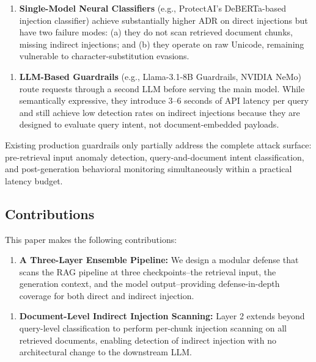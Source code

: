 \documentclass[conference]{IEEEtran}
\begin{document}
\begin{enumerate}
\item \textbf{Single-Model Neural Classifiers} (e.g., ProtectAI's DeBERTa-based injection classifier) achieve substantially higher ADR on direct injections but have two failure modes: (a) they do not scan retrieved document chunks, missing indirect injections; and (b) they operate on raw Unicode, remaining vulnerable to character-substitution evasions.
\end{enumerate}

\begin{enumerate}
\item \textbf{LLM-Based Guardrails} (e.g., Llama-3.1-8B Guardrails, NVIDIA NeMo) route requests through a second LLM before serving the main model. While semantically expressive, they introduce 3--6 seconds of API latency per query and still achieve low detection rates on indirect injections because they are designed to evaluate query intent, not document-embedded payloads.
\end{enumerate}

Existing production guardrails only partially address the complete attack surface: pre-retrieval input anomaly detection, query-and-document intent classification, and post-generation behavioral monitoring simultaneously within a practical latency budget.


\subsection{Contributions}

This paper makes the following contributions:


\begin{enumerate}
\item \textbf{A Three-Layer Ensemble Pipeline:} We design a modular defense that scans the RAG pipeline at three checkpoints--the retrieval input, the generation context, and the model output--providing defense-in-depth coverage for both direct and indirect injection.
\end{enumerate}

\begin{enumerate}
\item \textbf{Document-Level Indirect Injection Scanning:} Layer 2 extends beyond query-level classification to perform per-chunk injection scanning on all retrieved documents, enabling detection of indirect injection with no architectural change to the downstream LLM.
\end{enumerate}
\end{document}
